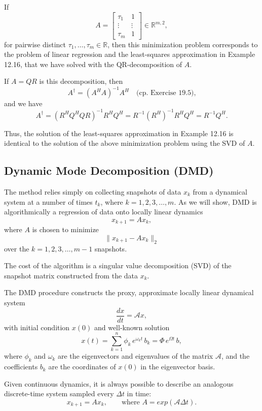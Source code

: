 \documentclass{article}
\begin{document}
If
\[
A =
\begin{bmatrix}
\tau_1 & 1 \\
\vdots & \vdots \\
\tau_m & 1
\end{bmatrix}
\in \mathbb{R}^{m,2},
\]
for pairwise distinct $\tau_1, \ldots, \tau_m \in \mathbb{R}$, then this minimization 
problem corresponds to the problem of linear regression and the least-squares 
approximation in Example 12.16, that we have solved with the QR-decomposition 
of $A$.

If $A = QR$ is this decomposition, then
\[
A^{\dagger} = (A^H A)^{-1} A^H 
\quad \text{(cp.\ Exercise 19.5),}
\]
and we have
\[
A^{\dagger} = (R^H Q^H Q R)^{-1} R^H Q^H 
= R^{-1} (R^H)^{-1} R^H Q^H 
= R^{-1} Q^H.
\]

Thus, the solution of the least-squares approximation in Example 12.16 is identical 
to the solution of the above minimization problem using the SVD of $A$.


\newpage

\subsection{Dynamic Mode Decomposition (DMD)}

\vspace{1cm}

The method relies simply on collecting snapshots of data $x_k$ from a dynamical system 
at a number of times $t_k$, where $k = 1,2,3,\dots,m$. As we will show, DMD is 
algorithmically a regression of data onto locally linear dynamics
\[
x_{k+1} = A x_k,
\]
where $A$ is chosen to minimize
\[
\| x_{k+1} - A x_k \|_2
\]
over the $k = 1,2,3,\dots,m-1$ snapshots.  

The cost of the algorithm is a singular 
value decomposition (SVD) of the snapshot matrix constructed from the data $x_k$.

The DMD procedure constructs the proxy, approximate locally linear dynamical system
\[
\frac{d x}{dt} = \mathcal{A}x  ,
\]
with initial condition $x(0)$ and well-known solution 
\[
x(t) = \sum_{k=1}^n \phi_k \, e^{\omega_k t} \, b_k 
= \Phi \, e^{\Omega t} \, b,
\]
where $\phi_k$ and $\omega_k$ are the eigenvectors and eigenvalues of the matrix $\mathcal{A}$, 
and the coefficients $b_k$ are the coordinates of $x(0)$ in the eigenvector basis.  

Given continuous dynamics, it is always possible to describe an analogous 
discrete-time system sampled every $\Delta t$ in time:
\[
x_{k+1} = A x_k,
\qquad \text{where } A = exp{(\mathcal{A} \Delta t)}.
\]
\end{document}

